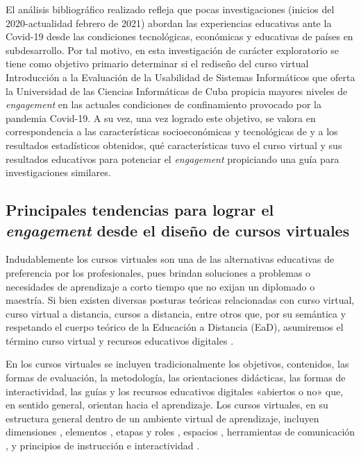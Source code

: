 \documentclass{textolivre}
\begin{document}
El análisis bibliográfico realizado refleja que pocas investigaciones (inicios del 2020-actualidad febrero de 2021) abordan las experiencias educativas ante la Covid-19 desde las condiciones tecnológicas, económicas y educativas de países en subdesarrollo. Por tal motivo, en esta investigación de carácter exploratorio se tiene como objetivo primario determinar si el rediseño del curso virtual Introducción a la Evaluación de la Usabilidad de Sistemas Informáticos que oferta la Universidad de las Ciencias Informáticas de Cuba propicia mayores niveles de \emph{engagement} en las actuales condiciones de confinamiento provocado por la pandemia Covid-19.  A su vez, una vez logrado este objetivo, se valora en correspondencia a las características socioeconómicas y tecnológicas de y a los resultados estadísticos obtenidos, qué características tuvo el curso virtual y sus resultados educativos para potenciar el \emph{engagement} propiciando una guía para investigaciones similares.

\subsection{Principales tendencias para lograr el \emph{engagement} desde el diseño de cursos virtuales}
Indudablemente los cursos virtuales son una de las alternativas educativas de preferencia por los profesionales, pues brindan soluciones a problemas o necesidades de aprendizaje a corto tiempo que no exijan un diplomado o maestría. Si bien existen diversas posturas teóricas relacionadas con curso virtual, curso virtual a distancia, cursos a distancia, entre otros que, por su semántica y respetando el cuerpo teórico de la Educación a Distancia (EaD), asumiremos el término curso virtual y recursos educativos digitales \cite{garciaaretio2020}. %

En los cursos virtuales se incluyen tradicionalmente los objetivos, contenidos, las formas de evaluación, la metodología, las orientaciones didácticas, las formas de interactividad, las guías y los recursos educativos digitales «abiertos o no» que, en sentido general, orientan hacia el aprendizaje. Los cursos virtuales, en su estructura general dentro de un ambiente virtual de aprendizaje, incluyen dimensiones \cite{coll2008}, %
elementos \cite{valenciavallejo2014}, %
etapas y roles \cite{perezberenguer2016}, %
espacios \cite{mauri2016}, %
herramientas de comunicación \cite{valenciavallejo2014}, %
y principios de instrucción e interactividad \cite{lin2020}. %
\end{document}
